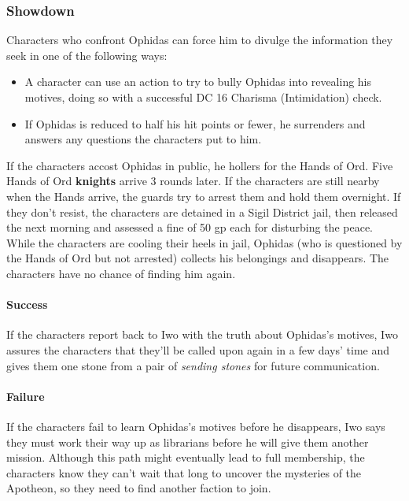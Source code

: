 \documentclass[a4paper, 11pt, bg=full, twocolumn, nooutline]{dndbook}
\begin{document}
\subsubsection{Showdown}

Characters who confront Ophidas can force him to divulge the information they seek in one of the following ways:

\begin{itemize}
\item A character can use an action to try to bully Ophidas into revealing his motives, doing so with a successful DC 16 Charisma (Intimidation) check.
\item If Ophidas is reduced to half his hit points or fewer, he surrenders and answers any questions the characters put to him.
\end{itemize}

If the characters accost Ophidas in public, he hollers for the Hands of Ord. Five Hands of Ord \textbf{knights} arrive 3 rounds later. If the characters are still nearby when the Hands arrive, the guards try to arrest them and hold them overnight. If they don't resist, the characters are detained in a Sigil District jail, then released the next morning and assessed a fine of 50 gp each for disturbing the peace. While the characters are cooling their heels in jail, Ophidas (who is questioned by the Hands of Ord but not arrested) collects his belongings and disappears. The characters have no chance of finding him again.

\paragraph{Success}

If the characters report back to Iwo with the truth about Ophidas's motives, Iwo assures the characters that they'll be called upon again in a few days' time and gives them one stone from a pair of \textit{sending stones} for future communication.

\paragraph{Failure}

If the characters fail to learn Ophidas's motives before he disappears, Iwo says they must work their way up as librarians before he will give them another mission. Although this path might eventually lead to full membership, the characters know they can't wait that long to uncover the mysteries of the Apotheon, so they need to find another faction to join.
\end{document}
